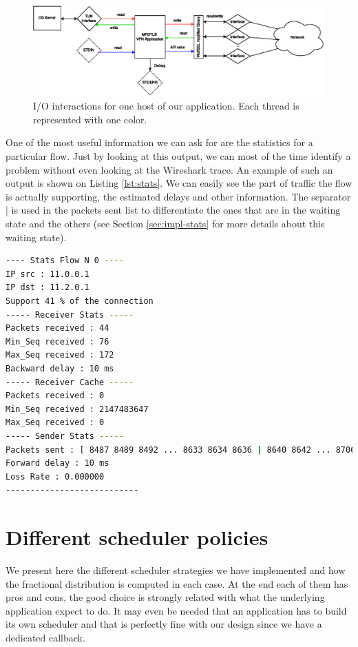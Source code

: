 \begin{figure}[!ht]
\centering
\includegraphics[width=\textwidth]{images/tunneling-IO.eps}
\caption[I/O interactions for one host of our application]{I/O interactions for one host of our application. Each thread is represented with one color.} 
\label{fig:vpn-io}
\end{figure}

One of the most useful information we can ask for are the statistics for a particular flow. Just by looking at this output, we can most of the time identify a problem without even looking at the Wireshark trace. An example of such an output is shown on Listing \ref{lst:stats}. We can easily see the part of traffic the flow is actually supporting, the estimated delays and other information. The separator | is used in the packets sent list to differentiate the ones that are in the waiting state and the others (see Section \ref{sec:impl-stats} for more details about this waiting state).

\begin{lstlisting}[language=bash,caption=An output of the statistics for a particular flow,label=lst:stats]
---- Stats Flow N 0 ---- 
IP src : 11.0.0.1 
IP dst : 11.2.0.1 
Support 41 % of the connection
----- Receiver Stats ----- 
Packets received : 44 
Min_Seq received : 76 
Max_Seq received : 172 
Backward delay : 10 ms
----- Receiver Cache ----- 
Packets received : 0 
Min_Seq received : 2147483647 
Max_Seq received : 0 
----- Sender Stats ----- 
Packets sent : [ 8487 8489 8492 ... 8633 8634 8636 | 8640 8642 ... 8706 8707] 
Forward delay : 10 ms
Loss Rate : 0.000000 
---------------------------

\end{lstlisting}

\section{Different scheduler policies}\label{sec:perf-sched}

We present here the different scheduler strategies we have implemented and how the fractional distribution is computed in each case. At the end each of them has pros and cons, the good choice is strongly related with what the underlying application expect to do. It may even be needed that an application has to build its own scheduler and that is perfectly fine with our design since we have a dedicated callback.

